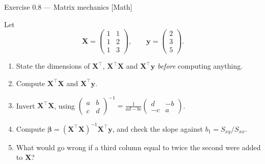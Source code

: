 \documentclass[aspectratio=169,11pt]{beamer}
\begin{document}
\begin{frame}{Exercise 0.8 --- Matrix mechanics [Math]}
  \begin{exercise}
    Let
    \[
      \mathbf{X} = \begin{pmatrix} 1 & 1 \\ 1 & 2 \\ 1 & 3 \end{pmatrix},
      \qquad
      \mathbf{y} = \begin{pmatrix} 2 \\ 3 \\ 5 \end{pmatrix}.
    \]
    \begin{enumerate}
      \item State the dimensions of $\mathbf{X}^\top$,
            $\mathbf{X}^\top\mathbf{X}$ and $\mathbf{X}^\top\mathbf{y}$
            \emph{before} computing anything.
      \item Compute $\mathbf{X}^\top\mathbf{X}$ and
            $\mathbf{X}^\top\mathbf{y}$.
      \item Invert $\mathbf{X}^\top\mathbf{X}$, using
            $\begin{pmatrix} a & b \\ c & d\end{pmatrix}^{-1}
             = \frac{1}{ad-bc}\begin{pmatrix} d & -b \\ -c & a\end{pmatrix}$.
      \item Compute
            $\hat{\boldsymbol\beta}
             = (\mathbf{X}^\top\mathbf{X})^{-1}\mathbf{X}^\top\mathbf{y}$,
            and check the slope against $b_1 = S_{xy}/S_{xx}$.
      \item What would go wrong if a third column equal to twice the second
            were added to $\mathbf{X}$?
    \end{enumerate}
  \end{exercise}
\end{frame}
\end{document}
